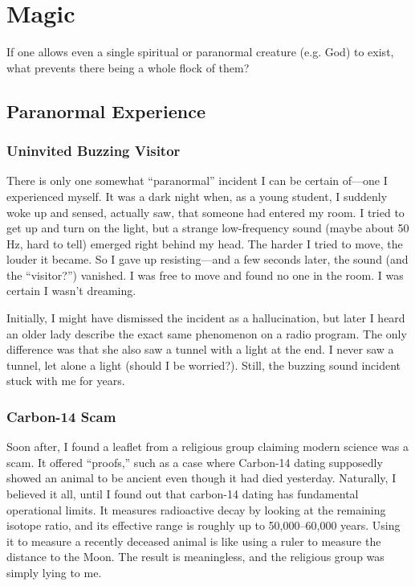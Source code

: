 \chapter{Magic}
\label{chap:magic}

If one allows even a single spiritual or paranormal creature (e.g. God) to exist, what prevents there being a whole flock of them?

\section*{Paranormal Experience}

\subsection*{Uninvited Buzzing Visitor}

There is only one somewhat ``paranormal'' incident I can be certain of—one I experienced myself. It was a dark night when, as a young student, I suddenly woke up and sensed, actually saw, that someone had entered my room. I tried to get up and turn on the light, but a strange low-frequency sound (maybe about 50 Hz, hard to tell) emerged right behind my head. The harder I tried to move, the louder it became. So I gave up resisting—and a few seconds later, the sound (and the ``visitor?'') vanished. I was free to move and found no one in the room. I was certain I wasn't dreaming.

Initially, I might have dismissed the incident as a hallucination, but later I heard an older lady describe the exact same phenomenon on a radio program. The only difference was that she also saw a tunnel with a light at the end. I never saw a tunnel, let alone a light (should I be worried?). Still, the buzzing sound incident stuck with me for years.

\subsection*{Carbon-14 Scam}

Soon after, I found a leaflet from a religious group claiming modern science was a scam. It offered ``proofs,'' such as a case where Carbon-14 dating supposedly showed an animal to be ancient even though it had died yesterday. 
Naturally, I believed it all, until I found out that carbon-14 dating has fundamental operational limits. 
It measures radioactive decay by looking at the remaining isotope ratio, and its effective range is roughly up to 50,000–60,000 years.
Using it to measure a recently deceased animal is like using a ruler to measure the distance to the Moon. The result is meaningless, and the religious group was simply lying to me.

